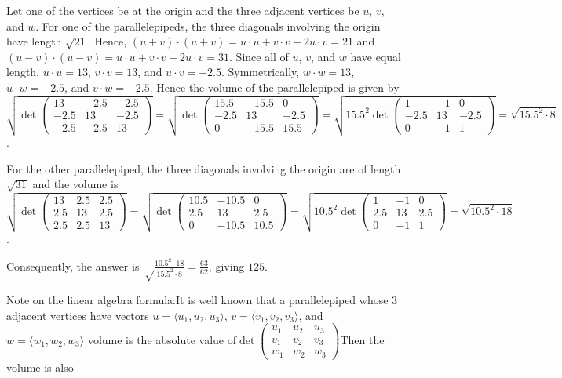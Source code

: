 \begin{enumerate}
{{Let one of the vertices be at the origin and the three adjacent vertices be $u$, $v$, and $w$. For one of the parallelepipeds, the three diagonals involving the origin have length $\sqrt {21}$. Hence, $(u+v)\cdot (u+v)=u\cdot u+v\cdot v+2u\cdot v=21$ and $(u-v)\cdot (u-v)=u\cdot u+v\cdot v-2u\cdot v=31$. Since all of $u$, $v$, and $w$ have equal length, $u\cdot u=13$, $v\cdot v=13$, and $u\cdot v=-2.5$. Symmetrically, $w\cdot w=13$, $u\cdot w=-2.5$, and $v\cdot w=-2.5$. Hence the volume of the parallelepiped is given by $\sqrt{\operatorname{det}\begin{pmatrix}13&-2.5&-2.5\\-2.5&13&-2.5\\-2.5&-2.5&13\end{pmatrix}}=\sqrt{\operatorname{det}\begin{pmatrix}15.5&-15.5&0\\-2.5&13&-2.5\\0&-15.5&15.5\end{pmatrix}}=\sqrt{15.5^2\operatorname\det\begin{pmatrix}1&-1&0\\-2.5&13&-2.5\\0&-1&1\end{pmatrix}}=\sqrt{15.5^2\cdot 8}$.

 For the other parallelepiped, the three diagonals involving the origin are of length $\sqrt{31}$ and the volume is $\sqrt{\operatorname{det}\begin{pmatrix}13&2.5&2.5\\2.5&13&2.5\\2.5&2.5&13\end{pmatrix}}=\sqrt{\operatorname{det}\begin{pmatrix}10.5&-10.5&0\\2.5&13&2.5\\0&-10.5&10.5\end{pmatrix}}=\sqrt{10.5^2\operatorname\det\begin{pmatrix}1&-1&0\\2.5&13&2.5\\0&-1&1\end{pmatrix}}=\sqrt{10.5^2\cdot 18}$.

 Consequently, the answer is $\sqrt\frac{10.5^2\cdot 18}{15.5^2\cdot 8}=\frac{63}{62}$, giving $\boxed{125}$.

 Note on the linear algebra formula:It is well known that a parallelepiped whose 3 adjacent vertices have vectors $u= \langle u_1, u_2, u_3 \rangle$, $v= \langle v_1, v_2, v_3 \rangle$, and $w = \langle w_1, w_2, w_3 \rangle$ volume is the absolute value of$\operatorname{det} \begin{pmatrix} u_1 & u_2 & u_3 \\ v_1 & v_2 & v_3 \\ w_1 & w_2 & w_3  \end{pmatrix}$Then the volume is also

}}
\end{enumerate}
